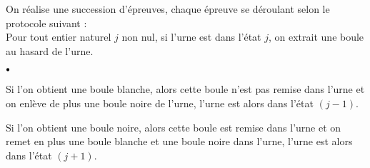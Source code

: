 \documentclass[11pt]{article}%
\begin{document}
\noindent On réalise une succession d'épreuves, chaque épreuve se
déroulant selon le protocole suivant : \\
Pour tout entier naturel $j$ non nul, si l'urne est dans l'état $j$, on
extrait une boule au hasard de l'urne.
\begin{noliste}{$\scriptstyle \bullet$}

\item Si l'on obtient une boule blanche, alors cette boule n'est pas
remise dans l'urne et on enlève de plus une boule noire de l'urne,
l'urne est alors dans l'état $(j-1)$. 

\item Si l'on obtient une boule noire, alors cette boule est remise
dans l'urne et on remet en plus une boule blanche et une boule noire
dans l'urne, l'urne est alors dans l'état $(j + 1)$. \\

\end{noliste}
\end{document}
